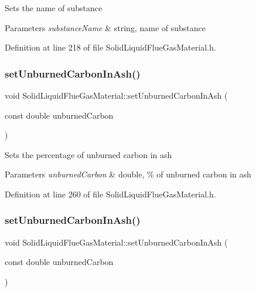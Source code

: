 Sets the name of substance 
\begin{DoxyParams}{Parameters}
{\em substance\+Name} & string, name of substance \\
\hline
\end{DoxyParams}


Definition at line 218 of file Solid\+Liquid\+Flue\+Gas\+Material.\+h.

\mbox{\label{class_solid_liquid_flue_gas_material_adf052dd1bdceeab710a4986b1fd874b9}} 
\subsubsection{\texorpdfstring{set\+Unburned\+Carbon\+In\+Ash()}{setUnburnedCarbonInAsh()}\hspace{0.1cm}{\footnotesize\ttfamily [1/3]}}
{\footnotesize\ttfamily void Solid\+Liquid\+Flue\+Gas\+Material\+::set\+Unburned\+Carbon\+In\+Ash (\begin{DoxyParamCaption}\item[{const double}]{unburned\+Carbon }\end{DoxyParamCaption})\hspace{0.3cm}{\ttfamily [inline]}}

Sets the percentage of unburned carbon in ash 
\begin{DoxyParams}{Parameters}
{\em unburned\+Carbon} & double, \% of unburned carbon in ash \\
\hline
\end{DoxyParams}


Definition at line 260 of file Solid\+Liquid\+Flue\+Gas\+Material.\+h.

\mbox{\label{class_solid_liquid_flue_gas_material_adf052dd1bdceeab710a4986b1fd874b9}} 
\subsubsection{\texorpdfstring{set\+Unburned\+Carbon\+In\+Ash()}{setUnburnedCarbonInAsh()}\hspace{0.1cm}{\footnotesize\ttfamily [2/3]}}
{\footnotesize\ttfamily void Solid\+Liquid\+Flue\+Gas\+Material\+::set\+Unburned\+Carbon\+In\+Ash (\begin{DoxyParamCaption}\item[{const double}]{unburned\+Carbon }\end{DoxyParamCaption})\hspace{0.3cm}{\ttfamily [inline]}}

